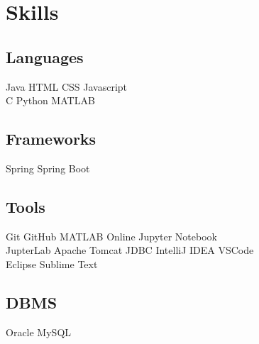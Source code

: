 \documentclass[]{deedy-resume-openfont}
\begin{document}
%
%
\lastupdated

%
%

%
%

\begin{minipage}[t]{0.33\textwidth} 


\section{Skills}
\subsection{Languages}
Java \textbullet{} HTML \textbullet{} CSS \textbullet{} Javascript \\
\textbullet{} C  \textbullet{} Python \textbullet{} MATLAB


\subsection{Frameworks}
Spring \textbullet{} Spring Boot\\

\subsection{Tools}
Git \textbullet{} GitHub  \textbullet{} MATLAB Online  \textbullet{} Jupyter Notebook \\ \textbullet{} JupterLab \textbullet{} Apache Tomcat   \textbullet{} JDBC \textbullet{} IntelliJ IDEA \textbullet{} VSCode \\ \textbullet{} Eclipse \textbullet{} Sublime Text
\sectionsep

\subsection{DBMS}
Oracle \textbullet{} MySQL 
\sectionsep


\end{minipage}
\end{document}
